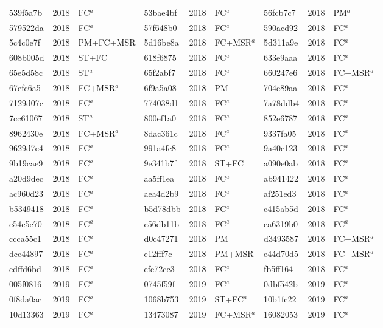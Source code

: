 \begin{longtable}{lll@{\hspace{10pt}}lll@{\hspace{10pt}}lll}
539f5a7b & 2018 & FC$^{a}$ & 53bae4bf & 2018 & FC$^{a}$ & 56fcb7c7 & 2018 & PM$^{a}$ \\
579522da & 2018 & FC$^{a}$ & 57f648b0 & 2018 & FC$^{a}$ & 590acd92 & 2018 & FC$^{a}$ \\
5c4c0e7f & 2018 & PM+FC+MSR & 5d16be8a & 2018 & FC+MSR$^{a}$ & 5d311a9e & 2018 & FC$^{a}$ \\
608b005d & 2018 & ST+FC & 618f6875 & 2018 & FC$^{a}$ & 633e9aaa & 2018 & FC$^{a}$ \\
65e5d58c & 2018 & ST$^{a}$ & 65f2abf7 & 2018 & FC$^{a}$ & 660247e6 & 2018 & FC+MSR$^{a}$ \\
67efc6a5 & 2018 & FC+MSR$^{a}$ & 6f9a5a08 & 2018 & PM & 704e89aa & 2018 & FC$^{a}$ \\
7129d07c & 2018 & FC$^{a}$ & 774038d1 & 2018 & FC$^{a}$ & 7a78ddb4 & 2018 & FC$^{a}$ \\
7cc61067 & 2018 & ST$^{a}$ & 800ef1a0 & 2018 & FC$^{a}$ & 852e6787 & 2018 & FC$^{a}$ \\
8962430e & 2018 & FC+MSR$^{a}$ & 8dac361c & 2018 & FC$^{a}$ & 9337fa05 & 2018 & FC$^{a}$ \\
9629d7e4 & 2018 & FC$^{a}$ & 991a4fc8 & 2018 & FC$^{a}$ & 9a40c123 & 2018 & FC$^{a}$ \\
9b19cae9 & 2018 & FC$^{a}$ & 9e341b7f & 2018 & ST+FC & a090e0ab & 2018 & FC$^{a}$ \\
a20d9dec & 2018 & FC$^{a}$ & aa5ff1ea & 2018 & FC$^{a}$ & ab941422 & 2018 & FC$^{a}$ \\
ac960d23 & 2018 & FC$^{a}$ & aea4d2b9 & 2018 & FC$^{a}$ & af251ed3 & 2018 & FC$^{a}$ \\
b5349418 & 2018 & FC$^{a}$ & b5d78dbb & 2018 & FC$^{a}$ & c415ab5d & 2018 & FC$^{a}$ \\
c54c5c70 & 2018 & FC$^{a}$ & c56db11b & 2018 & FC$^{a}$ & ca6319b0 & 2018 & FC$^{a}$ \\
ccca55c1 & 2018 & FC$^{a}$ & d0c47271 & 2018 & PM & d3493587 & 2018 & FC+MSR$^{a}$ \\
dcc44897 & 2018 & FC$^{a}$ & e12fff7c & 2018 & PM+MSR & e44d70d5 & 2018 & FC+MSR$^{a}$ \\
edffd6bd & 2018 & FC$^{a}$ & efe72cc3 & 2018 & FC$^{a}$ & fb5ff164 & 2018 & FC$^{a}$ \\
005f0816 & 2019 & FC$^{a}$ & 0745f59f & 2019 & FC$^{a}$ & 0dbf542b & 2019 & FC$^{a}$ \\
0f8da0ac & 2019 & FC$^{a}$ & 1068b753 & 2019 & ST+FC$^{a}$ & 10b1fc22 & 2019 & FC$^{a}$ \\
10d13363 & 2019 & FC$^{a}$ & 13473087 & 2019 & FC+MSR$^{a}$ & 16082053 & 2019 & FC$^{a}$ \\

\end{longtable}
